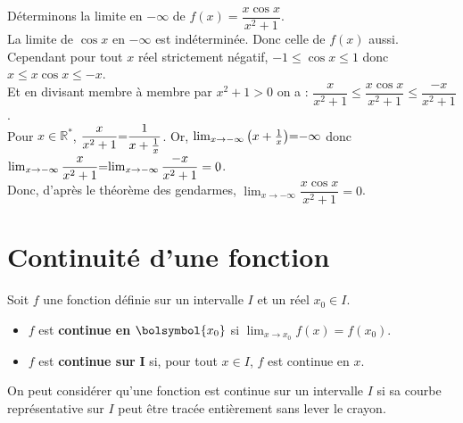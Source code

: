 \documentclass{cornouaille}
\begin{document}
\begin{exemple}
Déterminons la limite en $-\infty$ de $f(x)=\dfrac{x\cos x}{x^2+1}$.\\
 La limite de $\cos x$ en $-\infty$ est indéterminée. Donc celle de $f(x)$ aussi.\\
 Cependant pour tout $x$ réel strictement négatif, $-1\leqslant\cos x\leqslant 1$ donc $x\leqslant x\cos x\leqslant -x$.\\
 Et en divisant membre à membre par $x^2+1>0$ on a : $\dfrac{x}{x^2+1}\leqslant \dfrac{x\cos x}{x^2+1}\leqslant \dfrac{-x}{x^2+1}$.\\[2mm]
Pour $x\in\mathbb{R}^*$, $\dfrac{x}{x^2+1}\hspace{-1mm} =\hspace{-1mm} \dfrac{1}{x+\tfrac{1}{x}}$. Or, $\lim_{x\rightarrow-\infty}\left(x+\frac{1}{x}\right)\hspace{-1mm} =\hspace{-1mm} -\infty$ donc $\lim_{x\rightarrow-\infty}\dfrac{x}{x^2+1}\hspace{-1mm} =\hspace{-1mm} \lim_{x\rightarrow-\infty}\dfrac{-x}{x^2+1}=0$.\\[2mm]
Donc, d'après le théorème des gendarmes, $\lim_{x\rightarrow-\infty}\dfrac{x\cos x}{x^2+1}=0$.
\end{exemple}

\section{Continuité d'une fonction}


\begin{definition}
Soit $f$ une fonction définie sur un intervalle $I$ et un réel $x_{0}\in I$.
\begin{itemize}
\item $f$ est \textbf{continue en} $\bolsymbol{x_{0}}$ si  $\lim_{x\to x_0}f(x)=f(x_0)$.
\item $f$ est \textbf{continue sur} $\boldsymbol{I}$ si, pour tout $x\in I$, $f$ est continue en $x$.
\end{itemize}
\end{definition}

\begin{remarque}
On peut considérer qu'une fonction est continue sur un intervalle $I$ si sa courbe représentative sur $I$ peut être tracée entièrement sans lever le crayon.
\end{remarque}
\end{document}
